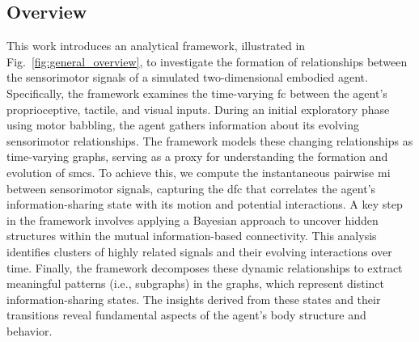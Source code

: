 \subsection{Overview}
This work introduces an analytical framework, illustrated in Fig.~\ref{fig:general_overview}, to investigate the formation of relationships between the sensorimotor signals of a simulated two-dimensional embodied agent. Specifically, the framework examines the time-varying \acl{fc} between the agent's proprioceptive, tactile, and visual inputs. During an initial exploratory phase using motor babbling, the agent gathers information about its evolving sensorimotor relationships. The framework models these changing relationships as time-varying graphs, serving as a proxy for understanding the formation and evolution of \acp{smc}. To achieve this, we compute the instantaneous pairwise \ac{mi} between sensorimotor signals, capturing the \acl{dfc} that correlates the agent’s information-sharing state with its motion and potential interactions. A key step in the framework involves applying a Bayesian approach to uncover hidden structures within the mutual information-based connectivity. This analysis identifies clusters of highly related signals and their evolving interactions over time. Finally, the framework decomposes these dynamic relationships to extract meaningful patterns (i.e., subgraphs) in the graphs, which represent distinct information-sharing states. The insights derived from these states and their transitions reveal fundamental aspects of the agent’s body structure and behavior.
